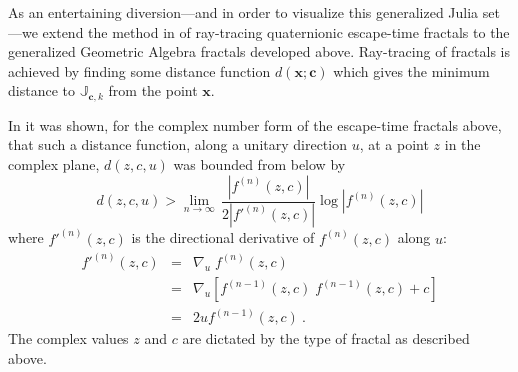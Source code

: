 \documentclass{elsart}
\theoremstyle{definition}
\begin{document}
As an entertaining diversion---and in order to visualize this generalized 
Julia set---we extend the method in
\cite{FRAC:HypercomplexIterations} of ray-tracing quaternionic escape-time
fractals to the generalized Geometric Algebra fractals developed above.
Ray-tracing of fractals is achieved by finding some distance function
$d(\mathbf{x};\mathbf{c})$ which gives the minimum distance to $\mathbb{J}_{\mathbf{c},k}$
from the point $\mathbf{x}$. 

In \cite{FRAC:HypercomplexIterations} it was shown, for the complex number form
of the escape-time fractals above, that such a distance function, along a unitary
direction $u$, at
a point $z$ in the complex plane, $d(z,c,u)$ was bounded from below by
\begin{equation}
d(z,c,u) > \lim_{n \rightarrow \infty}\,\frac{|f^{(n)}(z,c)|}{2|f'^{(n)}(z,c)|}
\log|f^{(n)}(z,c)|
\end{equation}
where $f'^{(n)}(z,c)$ is the directional derivative of $f^{(n)}(z,c)$ along $u$:
\begin{eqnarray}
f'^{(n)}(z,c) &=& \nabla_u\;f^{(n)}(z,c)\\
&=& \nabla_u \left[ f^{(n-1)}(z,c)\;f^{(n-1)}(z,c) + c \right] \\
&=& 2uf^{(n-1)}(z,c)\ .
\end{eqnarray}
The complex values $z$ and $c$ are
dictated by the type of fractal as described above.
\end{document}
